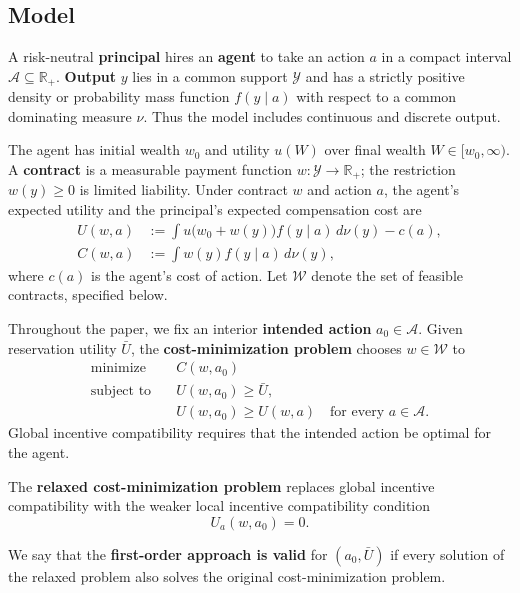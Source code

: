 \subsection{Model}

A risk-neutral \textbf{principal} hires an \textbf{agent} to take an action
$a$ in a compact interval $\mathcal A\subseteq\mathbb R_+$.  \textbf{Output}
$y$ lies in a
common support $\mathcal Y$ and has a strictly positive density or probability
mass function $f(y\mid a)$ with respect to a common dominating measure $\nu$.
Thus the model includes continuous and discrete output.

The agent has initial wealth $w_0$ and utility $u(W)$ over final wealth
$W\in[w_0,\infty)$.  A \textbf{contract} is a measurable payment function
$w:\mathcal Y\to\mathbb R_+$; the restriction $w(y)\geq0$ is limited liability.
Under contract $w$ and action $a$, the agent's expected utility and the
principal's expected compensation cost are
\begin{align*}
    U(w,a)
    &:=\int u\bigl(w_0+w(y)\bigr)f(y\mid a)\,d\nu(y)-c(a),\\
    C(w,a)
    &:=\int w(y)f(y\mid a)\,d\nu(y),
\end{align*}
where $c(a)$ is the agent's cost of action.  Let $\mathcal W$ denote the set of
feasible contracts, specified below.

Throughout the paper, we fix an interior
\textbf{intended action} $a_0\in\mathcal A$.
Given reservation utility
$\bar U$, the \textbf{cost-minimization problem}
chooses $w\in\mathcal W$ to
\begin{align}
    \text{minimize}\quad & C(w,a_0) \nonumber\\
    \text{subject to}\quad
    &U(w,a_0)\geq\bar U, \tag{IR}\label{IR}\\
    &U(w,a_0)\geq U(w,a)
      \quad\text{for every }a\in\mathcal A. \tag{GIC}\label{GIC}
\end{align}
Global incentive compatibility requires that the intended action be optimal for
the agent.

The \textbf{relaxed cost-minimization problem} replaces global incentive
compatibility with the weaker local incentive compatibility condition
\begin{equation}
    U_a(w,a_0)=0. \tag{LIC}\label{LIC_relaxed}
\end{equation}

We say that the \textbf{first-order approach is valid} for $(a_0,\bar U)$ if
every solution of the relaxed problem also solves the original
cost-minimization problem.

